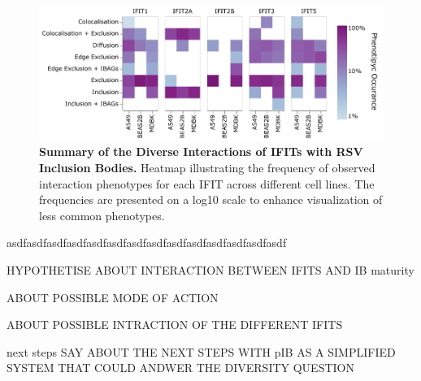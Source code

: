 \begin{figure}
    \centering
    \includegraphics[width=1\linewidth]{08. Chapter 3/Figs/heatmap_infection.pdf}
    \caption[Summary of the Diverse Interactions of IFITs with RSV Inclusion Bodies.]{\textbf{Summary of the Diverse Interactions of IFITs with RSV Inclusion Bodies.} Heatmap illustrating the frequency of observed interaction phenotypes for each IFIT across different cell lines. The frequencies are presented on a log10 scale to enhance visualization of less common phenotypes.}
    \label{fig:Summary of the Diverse Interactions of IFITs with RSV Inclusion Bodies}
\end{figure}

asdfasdfasdfasdfasdfasdfasdfasdfasdfasdfasdfasdfasdfasdf

HYPOTHETISE ABOUT INTERACTION BETWEEN IFITS AND IB maturity

ABOUT POSSIBLE MODE OF ACTION

ABOUT POSSIBLE INTRACTION OF THE DIFFERENT IFITS


next steps
SAY ABOUT THE NEXT STEPS WITH pIB AS A SIMPLIFIED SYSTEM THAT COULD ANDWER THE DIVERSITY QUESTION




